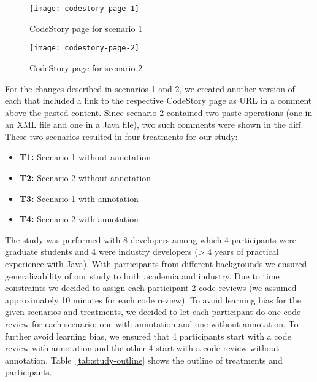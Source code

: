 \documentclass[../manifest.tex]{subfiles}
\begin{document}
\begin{figure}[h]
  \centering
  \texttt{[image: codestory-page-1]}
  \caption{CodeStory page for scenario 1}
  \label{fig:codestory-page-1}
\end{figure}

\begin{figure}[h]
  \centering
  \texttt{[image: codestory-page-2]}
  \caption{CodeStory page for scenario 2}
  \label{fig:codestory-page-2}
\end{figure}

For the changes described in scenarios 1 and 2, we created another version of each that included a link to the respective CodeStory page as URL in a comment above the pasted content. Since scenario 2 contained two paste operations (one in an XML file and one in a Java file), two such comments were shown in the diff.
These two scenarios resulted in four treatments for our study:
\begin{itemize}
  \item \textbf{T1:} Scenario 1 without annotation
  \item \textbf{T2:} Scenario 2 without annotation
  \item \textbf{T3:} Scenario 1 with annotation
  \item \textbf{T4:} Scenario 2 with annotation
\end{itemize}

The study was performed with 8 developers among which 4 participants were graduate students and 4 were industry developers (> 4 years of practical experience with Java). With participants from different backgrounds we ensured generalizability of our study to both academia and industry. Due to time constraints we decided to assign each participant 2 code reviews (we assumed approximately 10 minutes for each code review). To avoid learning bias for the given scenarios and treatments, we decided to let each participant do one code review for each scenario: one with annotation and one without annotation. To further avoid learning bias, we ensured that 4 participants start with a code review with annotation and the other 4 start with a code review without annotation. Table~\ref{tab:study-outline} shows the outline of treatments and participants.
\end{document}
